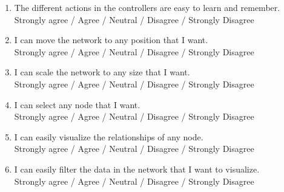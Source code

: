 \begin{enumerate}
  \item The different actions in the controllers are easy to learn and remember.\\
  Strongly agree / Agree / Neutral / Disagree / Strongly Disagree

  \item I can move the network to any position that I want.\\
  Strongly agree / Agree / Neutral / Disagree / Strongly Disagree

  \item I can scale the network to any size that I want.\\
  Strongly agree / Agree / Neutral / Disagree / Strongly Disagree

  \item I can select any node that I want.\\
  Strongly agree / Agree / Neutral / Disagree / Strongly Disagree

  \item I can easily visualize the relationships of any node.\\
  Strongly agree / Agree / Neutral / Disagree / Strongly Disagree

  \item I can easily filter the data in the network that I want to visualize.\\
  Strongly agree / Agree / Neutral / Disagree / Strongly Disagree
\end{enumerate}
